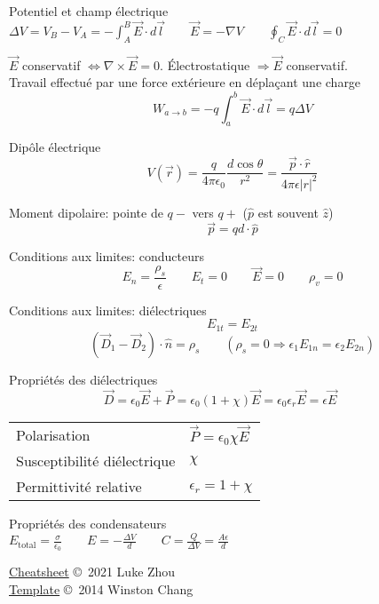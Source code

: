 \documentclass[10pt,landscape]{article}
\makeatletter
\renewcommand{\section}{\@startsection{section}{1}{0mm}%
                                {-1ex plus -.5ex minus -.2ex}%
                                {0.5ex plus .2ex}%
                                {\normalfont\large\bfseries}}
\newcommand{\extraline}{\vspace{1em}}
\makeatother
\begin{document}
\begin{multicols}{3}
Potentiel et champ électrique
$\Delta V = V_B - V_A  = -\int_A^B \vec{E}\cdot d\vec{l} \qquad \vec{E} = -\nabla V 
 \qquad \oint_C \vec{E}\cdot d\vec{l}  = 0 $

\extraline
$\vec{E}$ conservatif $\Leftrightarrow \nabla \times \vec{E} = 0$.
Électrostatique $\Rightarrow \vec{E}$ conservatif.\\ 

\extraline
Travail effectué par une force extérieure en déplaçant une charge
\[ W_{a\rightarrow b} = -q\int_{a}^{b} \vec{E}\cdot d\vec{l} = q\Delta V \]

Dipôle électrique
\[ V(\vec{r}) = \frac{q}{4\pi\epsilon_0} \frac{d\cos\theta}{r^2} = \frac{\vec{p}\cdot\hat{r}}{4\pi\epsilon|r|^2} \]

Moment dipolaire: pointe de $q-$ vers $q+$ ($\hat{p}$ est souvent $\hat{z}$)
\[ \vec{p} = qd\cdot \hat{p} \]

Conditions aux limites: conducteurs
\[ E_n = \frac{\rho_s}{\epsilon} \qquad E_t = 0 \qquad \vec{E} = 0 \qquad \rho_v = 0 \]

Conditions aux limites: diélectriques
\[ E_{1t} = E_{2t}  \]
\[ (\vec{D}_1 - \vec{D}_2) \cdot \hat{n} = \rho_s  \qquad (\rho_s=0 \Rightarrow \epsilon_1 E_{1n} = \epsilon_2 E_{2n}) \] 

\extraline
Propriétés des diélectriques
\[ \vec{D} = \epsilon_0\vec{E} + \vec{P} = \epsilon_0(1+\chi)\vec{E} = \epsilon_0\epsilon_r\vec{E} = \epsilon\vec{E}
\qquad   \]
\begin{tabular}{@{}ll@{}}
	Polarisation  & $\vec{P} = \epsilon_0\chi\vec{E}$ \\
	Susceptibilité diélectrique  & $\chi$ \\
	Permittivité relative &  $\epsilon_r=1+\chi$
\end{tabular}

\extraline
Propriétés des condensateurs \\
$E_\text{total} = \frac{\sigma}{\epsilon_0} \qquad E = -\frac{\Delta V}{d} 
\qquad C = \frac{Q}{\Delta V} = \frac{A\epsilon}{d}$ \\

\extraline
{}

\extraline
\hrulefill







\scriptsize

\href{https://github.com/zhouluke/PhysicsFormulas}{Cheatsheet}  \copyright\ 2021 Luke Zhou \\
\href{http://wch.github.io/latexsheet/}{Template}  \copyright\ 2014 Winston Chang


\end{multicols}
\end{document}
